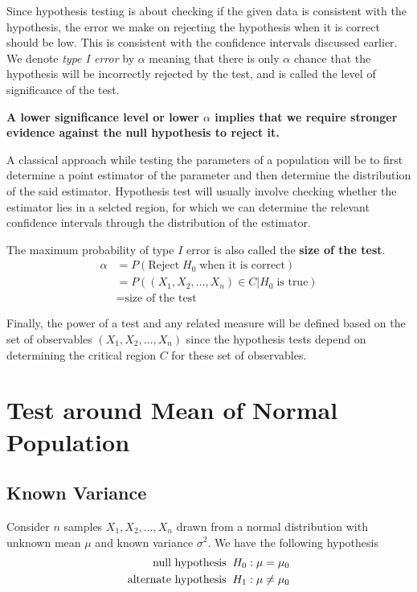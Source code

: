 \documentclass[../probability-notes.tex]{subfiles}
\begin{document}
    Since hypothesis testing is about checking if the given data is consistent with the hypothesis, the error we make on rejecting the hypothesis when it is correct should be low. This is consistent with the confidence intervals discussed earlier. We denote \emph{type I error} by $\alpha$ meaning that there is only $\alpha$ chance that the hypothesis will be incorrectly rejected by the test, and is called the level of significance of the test.\newline

    \textbf{A lower significance level or lower $\alpha$ implies that we require stronger evidence against the null hypothesis to reject it.}

    A classical approach while testing the parameters of a population will be to first determine a point estimator of the parameter and then determine the distribution of the said estimator. Hypothesis test will usually involve checking whether the estimator lies in a selcted region, for which we can determine the relevant confidence intervals through the distribution of the estimator.\newline

    The maximum probability of type $I$ error is also called the \textbf{size of the test}.
    \begin{align*}
        \alpha &= P(\text{Reject}\; H_{0}\; \text{when it is correct})\\
        &= P((X_{1}, X_{2}, \ldots, X_{n}) \in C \vert H_{0}\; \text{is true})\\
        &= \text{size of the test}
    \end{align*}

    Finally, the power of a test and any related measure will be defined based on the set of observables $(X_{1}, X_{2}, \ldots, X_{n})$ since the hypothesis tests depend on determining the critical region $C$ for these set of observables.

    \section{Test around Mean of Normal Population}
    \subsection{Known Variance}\label{sec:mean_normal_known_variance}
    Consider $n$ samples $X_{1}, X_{2}, \ldots, X_{n}$ drawn from a normal distribution with unknown mean $\mu$ and known variance $\sigma^{2}$. We have the following hypothesis
    \begin{align*}
        \text{null hypothesis \:} H_{0}&: \mu = \mu_{0}\\
        \text{alternate hypothesis \:} H_{1}&: \mu \neq \mu_{0}
    \end{align*}
\end{document}
